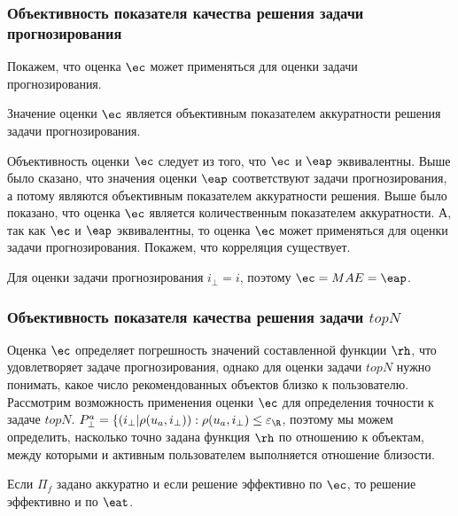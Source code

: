 \subsubsection{Объективность показателя качества решения задачи прогнозирования}
Покажем, что оценка $\ec$ может применяться для оценки задачи
прогнозирования.
\begin{trm}
Значение оценки $\ec$ является объективным показателем аккуратности решения
	задачи прогнозирования.
\end{trm}

Объективность оценки $\ec$ следует из того, что $\ec$ и $\eap$
эквивалентны.
Выше было сказано, что значения оценки $\eap$ соответствуют задачи
прогнозирования, а потому являются объективным показателем аккуратности
решения. Выше было показано, что оценка $\ec$ является количественным
показателем аккуратности. А, так как $\ec$ и $\eap$ эквивалентны,
то оценка $\ec$ может применяться для оценки задачи прогнозирования.
Покажем, что корреляция существует.

Для оценки задачи
прогнозирования $i_{\bot} = i$, поэтому
$\ec
= MAE = \eap$.

\subsubsection{Объективность показателя качества решения задачи $topN$}
Оценка $\ec$ определяет
погрешность значений составленной функции $\rh$, что удовлетворяет задаче
прогнозирования, однако для оценки задачи $topN$ нужно понимать, какое число
рекомендованных объектов близко к пользователю. Рассмотрим возможность
применения оценки $\ec$ для определения точности к задаче $topN$.
$P^a_{\bot} = \{(i_{\bot}| \rho(u_a,i_{\bot})): \rho(u_a,  i_{\bot}) \le
\varepsilon_{\R}$,
поэтому мы можем определить,
насколько точно задана функция $\rh$ по отношению к объектам, между которыми и
активным пользователем выполняется отношение близости.



\begin{trm}
Если $\Pi_f$ задано аккуратно и
если решение эффективно по $\ec$, то решение эффективно и по $\eat$.
\end{trm}

